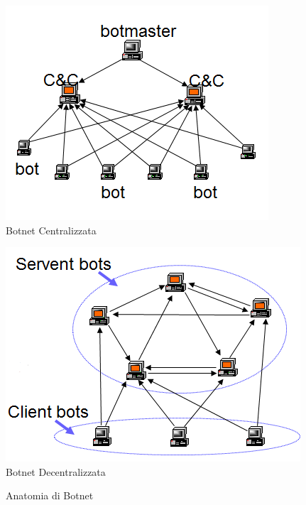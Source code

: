 \begin{figure}[!bp] 
  \begin{minipage}[b]{0.5\linewidth}
    \centering
    \includegraphics[width=\linewidth]{figures/botnet.png} \\ 
    Botnet Centralizzata
    \vspace{4ex}
  \end{minipage}%
  \begin{minipage}[b]{0.5\linewidth}
    \centering
    \includegraphics[width=\linewidth]{figures/botnetp2p.png} \\
    Botnet Decentralizzata 
    \vspace{4ex}
  \end{minipage} 
     \caption{Anatomia di Botnet\label{fig:botnet} }
\end{figure}

